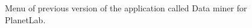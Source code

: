 \begin{figure}[H]
	\centering
	\caption{Menu of previous version of the application called Data miner for PlanetLab.}
	\label{fig:planetlaboldmenu}
\end{figure}


